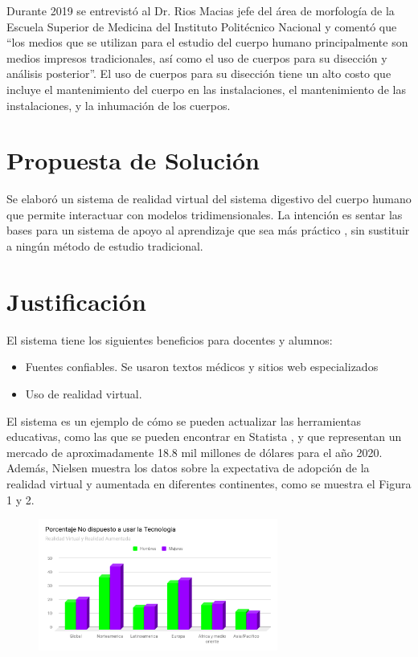Durante 2019 se entrevistó al Dr. Rios Macias jefe del área de morfología de la Escuela Superior de Medicina del Instituto Politécnico Nacional y comentó que “los medios que se utilizan para el estudio del cuerpo humano principalmente son medios impresos tradicionales, así como el uso de cuerpos para su disección y análisis posterior”. El uso de cuerpos para su disección tiene un alto costo que incluye el mantenimiento del cuerpo en las instalaciones, el mantenimiento de las instalaciones, y la inhumación de los cuerpos.
\\
\newline
\section{Propuesta de Solución}

Se elaboró un sistema de realidad virtual del sistema digestivo del cuerpo humano que permite interactuar con modelos tridimensionales. La intención es sentar las bases para un sistema de apoyo al aprendizaje que sea más práctico \cite{moore1995learning}, sin sustituir a ningún método de estudio tradicional.
\\
\section{Justificación}
\label{just}

El sistema tiene los siguientes beneficios para docentes y alumnos: 
\begin{itemize}
\item Fuentes confiables. Se usaron textos médicos y sitios web especializados
\item Uso de realidad virtual\cite{norton1994integrating}.
\end{itemize}

El sistema es un ejemplo de cómo se pueden actualizar las herramientas educativas, como las que se pueden encontrar en Statista \cite{web1}, y que representan un mercado de aproximadamente 18.8 mil millones de dólares para el año 2020. Además, Nielsen\cite{web2} muestra los datos sobre la expectativa de adopción de la realidad virtual y aumentada en diferentes continentes, como se muestra el Figura 1 y 2.

\begin{figure}[H]
\begin{center}
\includegraphics[width = 0.7\textwidth]{source/images/image2.png}
\end{center} 
\end{figure}

